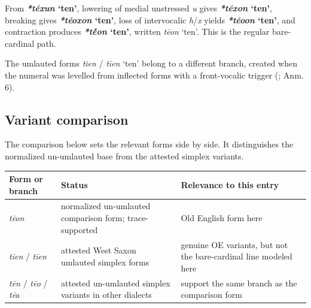\documentclass[
  british,
  a4paper,
  openany]{book}
\newcounter{none} %
\providecommand{\Recon}[1]{\emph{*#1}}
{\catcode`→=\active \global\def→{\ensuremath{\rightarrow}}}
\providecommand{\Recon}[1]{\emph{*#1}}
{\catcode`→=\active \global\def→{\ensuremath{\rightarrow}}}
\begin{document}
From \textbf{\Recon{téxun} `ten'}, lowering of medial unstressed
\emph{u} gives \textbf{\Recon{téxon} `ten'}, breaking gives
\textbf{\Recon{téoxon} `ten'}, loss of intervocalic \emph{h}/\emph{x}
yields \textbf{\Recon{téoon} `ten'}, and contraction produces
\textbf{\Recon{tḗon} `ten'}, written \emph{tēon} `ten'. This is the
regular bare-cardinal path.

The umlauted forms \emph{tien} / \emph{tīen} `ten' belong to a different
branch, created when the numeral was levelled from inflected forms with
a front-vocalic trigger (;
 Anm. 6).

\subsection{Variant comparison}\label{variant-comparison-1}

The comparison below sets the relevant forms side by side. It
distinguishes the normalized un-umlauted base from the attested simplex
variants.

{\def\LTcaptype{none} %
\begin{longtable}[]{@{}
  >{\raggedright\arraybackslash}p{}
  >{\raggedright\arraybackslash}p{}
  >{\raggedright\arraybackslash}p{}@{}}
\toprule\noalign{}
\begin{minipage}[b]{\linewidth}\raggedright
Form or branch
\end{minipage} & \begin{minipage}[b]{\linewidth}\raggedright
Status
\end{minipage} & \begin{minipage}[b]{\linewidth}\raggedright
Relevance to this entry
\end{minipage} \\
\midrule\noalign{}
\endhead
\bottomrule\noalign{}
\endlastfoot
\emph{tēon} & normalized un-umlauted comparison form; trace-supported &
Old English form here \\
\emph{tien} / \emph{tīen} & attested West Saxon umlauted simplex forms &
genuine OE variants, but not the bare-cardinal line modeled here \\
\emph{tēn} / \emph{tēo} / \emph{tēa} & attested un-umlauted simplex
variants in other dialects & support the same branch as the comparison
form \\
\end{longtable}
}
\end{document}
